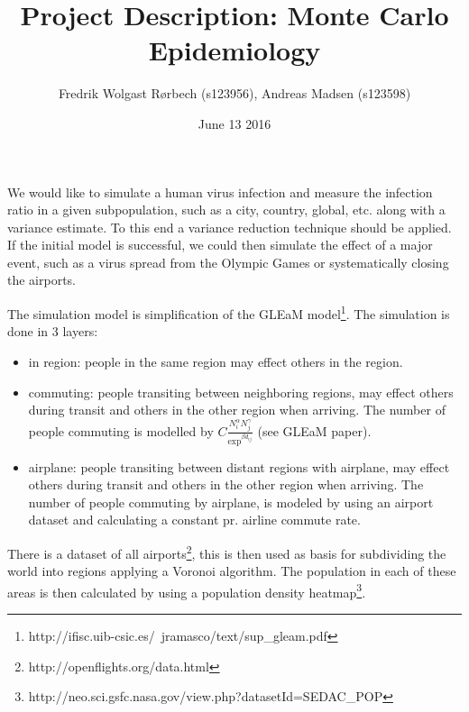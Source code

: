 \documentclass[a4paper]{article}
\begin{document}
\title{Project Description: Monte Carlo Epidemiology}
\author{Fredrik Wolgast Rørbech (s123956), Andreas Madsen (s123598)}
\date{June 13 2016}
\maketitle

We would like to simulate a human virus infection and measure the infection ratio in a given subpopulation, such as a city, country, global, etc. along with a variance estimate. To this end a variance reduction technique should be applied. If the initial model is successful, we could then simulate the effect of a major event, such as a virus spread from the Olympic Games or systematically closing the airports.

The simulation model is simplification of the GLEaM model\footnote{http://ifisc.uib-csic.es/~jramasco/text/sup\_gleam.pdf}. The simulation is done in 3 layers:
\begin{itemize}
\item in region: people in the same region may effect others in the region.
\item commuting: people transiting between neighboring regions, may effect others during transit and others in the other region when arriving. The number of people commuting is modelled by $C \frac{N_i^\alpha N_j^\gamma}{\mathrm{exp}^{\beta d_{ij}}}$ (see GLEaM paper).
\item airplane: people transiting between distant regions with airplane, may effect others during transit and others in the other region when arriving. The number of people commuting by airplane, is modeled by using an airport dataset and calculating a constant pr. airline commute rate.
\end{itemize}

There is a dataset of all airports\footnote{http://openflights.org/data.html}, this is then used as basis for subdividing the world into regions applying a Voronoi algorithm. The population in each of these areas is then calculated by using a population density heatmap\footnote{http://neo.sci.gsfc.nasa.gov/view.php?datasetId=SEDAC\_POP}.
\end{document}
